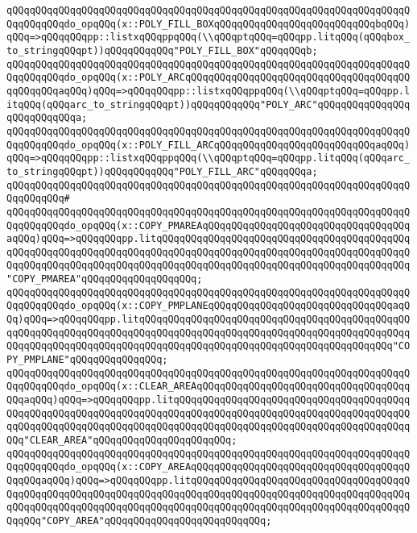 \verb|qQQqqQQqqQQqqQQqqQQqqQQqqQQqqQQqqQQqqQQqqQQqqQQqqQQqqQQqqQQqqQQqqQQqqQQqqQQqqQQqdo_opqQQq(x::POLY_FILL_BOXqQQqqQQqqQQqqQQqqQQqqQQqqQQqbqQQq)qQQq=>qQQqqQQqpp::listxqQQqppqQQq(\\qQQqptqQQq=qQQqpp.litqQQq(qQQqbox_to_stringqQQqpt))qQQqqQQqqQQq"POLY_FILL_BOX"qQQqqQQqb;|\newline
\verb|qQQqqQQqqQQqqQQqqQQqqQQqqQQqqQQqqQQqqQQqqQQqqQQqqQQqqQQqqQQqqQQqqQQqqQQqqQQqqQQqdo_opqQQq(x::POLY_ARCqQQqqQQqqQQqqQQqqQQqqQQqqQQqqQQqqQQqqQQqqQQqqQQqaqQQq)qQQq=>qQQqqQQqpp::listxqQQqppqQQq(\\qQQqptqQQq=qQQqpp.litqQQq(qQQqarc_to_stringqQQqpt))qQQqqQQqqQQq"POLY_ARC"qQQqqQQqqQQqqQQqqQQqqQQqqQQqa;|\newline
\verb|qQQqqQQqqQQqqQQqqQQqqQQqqQQqqQQqqQQqqQQqqQQqqQQqqQQqqQQqqQQqqQQqqQQqqQQqqQQqqQQqdo_opqQQq(x::POLY_FILL_ARCqQQqqQQqqQQqqQQqqQQqqQQqqQQqaqQQq)qQQq=>qQQqqQQqpp::listxqQQqppqQQq(\\qQQqptqQQq=qQQqpp.litqQQq(qQQqarc_to_stringqQQqpt))qQQqqQQqqQQq"POLY_FILL_ARC"qQQqqQQqa;|\newline
\verb|qQQqqQQqqQQqqQQqqQQqqQQqqQQqqQQqqQQqqQQqqQQqqQQqqQQqqQQqqQQqqQQqqQQqqQQqqQQqqQQq#|\newline
\verb|qQQqqQQqqQQqqQQqqQQqqQQqqQQqqQQqqQQqqQQqqQQqqQQqqQQqqQQqqQQqqQQqqQQqqQQqqQQqqQQqdo_opqQQq(x::COPY_PMAREAqQQqqQQqqQQqqQQqqQQqqQQqqQQqqQQqqQQqaqQQq)qQQq=>qQQqqQQqpp.litqQQqqQQqqQQqqQQqqQQqqQQqqQQqqQQqqQQqqQQqqQQqqQQqqQQqqQQqqQQqqQQqqQQqqQQqqQQqqQQqqQQqqQQqqQQqqQQqqQQqqQQqqQQqqQQqqQQqqQQqqQQqqQQqqQQqqQQqqQQqqQQqqQQqqQQqqQQqqQQqqQQqqQQqqQQqqQQqqQQqqQQq"COPY_PMAREA"qQQqqQQqqQQqqQQqqQQq;|\newline
\verb|qQQqqQQqqQQqqQQqqQQqqQQqqQQqqQQqqQQqqQQqqQQqqQQqqQQqqQQqqQQqqQQqqQQqqQQqqQQqqQQqdo_opqQQq(x::COPY_PMPLANEqQQqqQQqqQQqqQQqqQQqqQQqqQQqqQQqaqQQq)qQQq=>qQQqqQQqpp.litqQQqqQQqqQQqqQQqqQQqqQQqqQQqqQQqqQQqqQQqqQQqqQQqqQQqqQQqqQQqqQQqqQQqqQQqqQQqqQQqqQQqqQQqqQQqqQQqqQQqqQQqqQQqqQQqqQQqqQQqqQQqqQQqqQQqqQQqqQQqqQQqqQQqqQQqqQQqqQQqqQQqqQQqqQQqqQQqqQQqqQQq"COPY_PMPLANE"qQQqqQQqqQQqqQQq;|\newline
\verb|qQQqqQQqqQQqqQQqqQQqqQQqqQQqqQQqqQQqqQQqqQQqqQQqqQQqqQQqqQQqqQQqqQQqqQQqqQQqqQQqdo_opqQQq(x::CLEAR_AREAqQQqqQQqqQQqqQQqqQQqqQQqqQQqqQQqqQQqqQQqaqQQq)qQQq=>qQQqqQQqpp.litqQQqqQQqqQQqqQQqqQQqqQQqqQQqqQQqqQQqqQQqqQQqqQQqqQQqqQQqqQQqqQQqqQQqqQQqqQQqqQQqqQQqqQQqqQQqqQQqqQQqqQQqqQQqqQQqqQQqqQQqqQQqqQQqqQQqqQQqqQQqqQQqqQQqqQQqqQQqqQQqqQQqqQQqqQQqqQQqqQQqqQQq"CLEAR_AREA"qQQqqQQqqQQqqQQqqQQqqQQq;|\newline
\verb|qQQqqQQqqQQqqQQqqQQqqQQqqQQqqQQqqQQqqQQqqQQqqQQqqQQqqQQqqQQqqQQqqQQqqQQqqQQqqQQqdo_opqQQq(x::COPY_AREAqQQqqQQqqQQqqQQqqQQqqQQqqQQqqQQqqQQqqQQqqQQqaqQQq)qQQq=>qQQqqQQqpp.litqQQqqQQqqQQqqQQqqQQqqQQqqQQqqQQqqQQqqQQqqQQqqQQqqQQqqQQqqQQqqQQqqQQqqQQqqQQqqQQqqQQqqQQqqQQqqQQqqQQqqQQqqQQqqQQqqQQqqQQqqQQqqQQqqQQqqQQqqQQqqQQqqQQqqQQqqQQqqQQqqQQqqQQqqQQqqQQqqQQqqQQq"COPY_AREA"qQQqqQQqqQQqqQQqqQQqqQQqqQQq;|\newline
